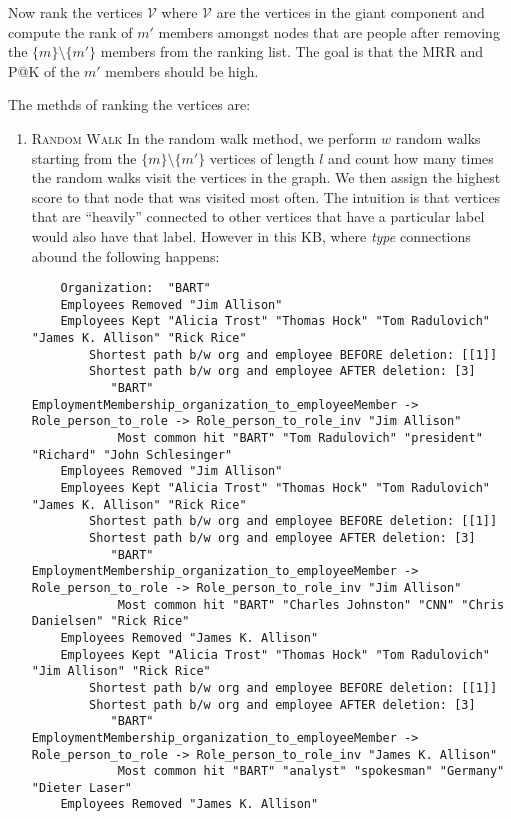 \documentclass{tufte-handout}
\begin{document}
Now rank the vertices $\mathcal{V}$ where $\mathcal{V}$ are the
vertices in the giant component and compute the rank of $m'$ members
amongst nodes that are people after removing the $\{m\} \setminus \{m'\}$
members from the ranking list. The goal is that the MRR and P@K of the $m'$
members should be high.

The methds of ranking the vertices are:
\begin{enumerate}
\item \textsc{Random Walk} In the random walk method, we perform
  $w$ random walks starting
  from the $\{m\} \setminus \{m'\}$ vertices of length $l$ and count how many
  times the random walks visit the vertices in the graph. We then assign the
  highest score to that node that was visited most often. The intuition is that
  vertices that are ``heavily'' connected to other vertices that have a particular
  label would also have that label.
  However in this KB, where \textit{type} connections abound the following happens:
  \begin{lstlisting}
    Organization:  "BART"
    Employees Removed "Jim Allison"
    Employees Kept "Alicia Trost" "Thomas Hock" "Tom Radulovich" "James K. Allison" "Rick Rice"
        Shortest path b/w org and employee BEFORE deletion: [[1]]
        Shortest path b/w org and employee AFTER deletion: [3]
           "BART" EmploymentMembership_organization_to_employeeMember -> Role_person_to_role -> Role_person_to_role_inv "Jim Allison"
            Most common hit "BART" "Tom Radulovich" "president" "Richard" "John Schlesinger"
    Employees Removed "Jim Allison"
    Employees Kept "Alicia Trost" "Thomas Hock" "Tom Radulovich" "James K. Allison" "Rick Rice"
        Shortest path b/w org and employee BEFORE deletion: [[1]]
        Shortest path b/w org and employee AFTER deletion: [3]
           "BART" EmploymentMembership_organization_to_employeeMember -> Role_person_to_role -> Role_person_to_role_inv "Jim Allison"
            Most common hit "BART" "Charles Johnston" "CNN" "Chris Danielsen" "Rick Rice"
    Employees Removed "James K. Allison"
    Employees Kept "Alicia Trost" "Thomas Hock" "Tom Radulovich" "Jim Allison" "Rick Rice"
        Shortest path b/w org and employee BEFORE deletion: [[1]]
        Shortest path b/w org and employee AFTER deletion: [3]
           "BART" EmploymentMembership_organization_to_employeeMember -> Role_person_to_role -> Role_person_to_role_inv "James K. Allison"
            Most common hit "BART" "analyst" "spokesman" "Germany" "Dieter Laser"
    Employees Removed "James K. Allison"

\end{lstlisting}
\end{enumerate}
\end{document}
